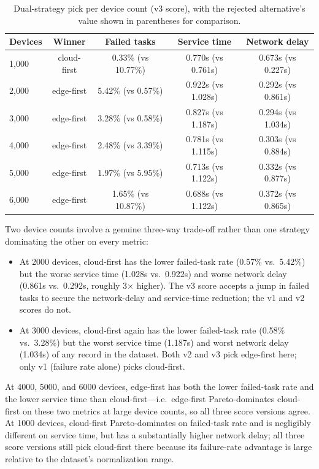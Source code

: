 \documentclass[10pt,conference]{IEEEtran}
\begin{document}
\begin{table}[!t]
\centering
\caption{Dual-strategy pick per device count (v3 score), with the rejected alternative's value shown in parentheses for comparison.}
\label{tab:dualoutcome}
\begin{tabular}{lcccc}
\toprule
\textbf{Devices} & \textbf{Winner} & \textbf{Failed tasks} & \textbf{Service time} & \textbf{Network delay} \\
\midrule
1,000 & cloud-first & 0.33\% (vs 10.77\%) & 0.770s (vs 0.761s) & 0.673s (vs 0.227s) \\
2,000 & edge-first & 5.42\% (vs 0.57\%) & 0.922s (vs 1.028s) & 0.292s (vs 0.861s) \\
3,000 & edge-first & 3.28\% (vs 0.58\%) & 0.827s (vs 1.187s) & 0.294s (vs 1.034s) \\
4,000 & edge-first & 2.48\% (vs 3.39\%) & 0.781s (vs 1.115s) & 0.303s (vs 0.884s) \\
5,000 & edge-first & 1.97\% (vs 5.95\%) & 0.713s (vs 1.122s) & 0.332s (vs 0.877s) \\
6,000 & edge-first & 1.65\% (vs 10.87\%) & 0.688s (vs 1.122s) & 0.372s (vs 0.865s) \\
\bottomrule
\end{tabular}
\end{table}

Two device counts involve a genuine three-way trade-off rather than one strategy dominating the other on every metric:
\begin{itemize}
\item At 2000 devices, cloud-first has the lower failed-task rate (0.57\% vs.\ 5.42\%) but the worse service time (1.028s vs.\ 0.922s) and worse network delay (0.861s vs.\ 0.292s, roughly 3$\times$ higher). The v3 score accepts a jump in failed tasks to secure the network-delay and service-time reduction; the v1 and v2 scores do not.
\item At 3000 devices, cloud-first again has the lower failed-task rate (0.58\% vs.\ 3.28\%) but the worst service time (1.187s) and worst network delay (1.034s) of any record in the dataset. Both v2 and v3 pick edge-first here; only v1 (failure rate alone) picks cloud-first.
\end{itemize}
At 4000, 5000, and 6000 devices, edge-first has both the lower failed-task rate and the lower service time than cloud-first---i.e.\ edge-first Pareto-dominates cloud-first on these two metrics at large device counts, so all three score versions agree. At 1000 devices, cloud-first Pareto-dominates on failed-task rate and is negligibly different on service time, but has a substantially higher network delay; all three score versions still pick cloud-first there because its failure-rate advantage is large relative to the dataset's normalization range.
\end{document}
